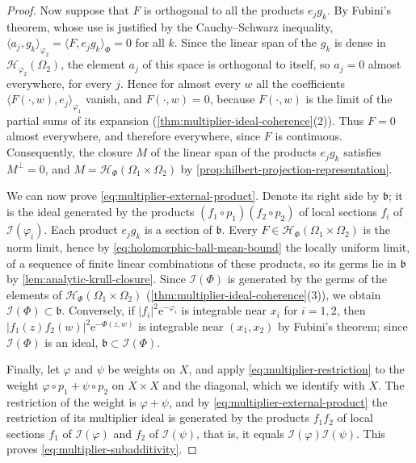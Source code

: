 \begin{proof}
Now suppose that $F$ is orthogonal to all the products $e_jg_k$. By Fubini's theorem, whose use is justified by the Cauchy--Schwarz inequality, $\langle a_j,g_k\rangle_{\varphi_2}=\langle F,e_jg_k\rangle_\Phi=0$ for all $k$. Since the linear span of the $g_k$ is dense in $\mathcal H_{\varphi_2}(\Omega_2)$, the element $a_j$ of this space is orthogonal to itself, so $a_j=0$ almost everywhere, for every $j$. Hence for almost every $w$ all the coefficients $\langle F(\cdot,w),e_j\rangle_{\varphi_1}$ vanish, and $F(\cdot,w)=0$, because $F(\cdot,w)$ is the limit of the partial sums of its expansion (\cref{thm:multiplier-ideal-coherence}(2)). Thus $F=0$ almost everywhere, and therefore everywhere, since $F$ is continuous. Consequently, the closure $M$ of the linear span of the products $e_jg_k$ satisfies $M^\perp=0$, and $M=\mathcal H_\Phi(\Omega_1\times\Omega_2)$ by \cref{prop:hilbert-projection-representation}.

We can now prove \eqref{eq:multiplier-external-product}. Denote its right side by $\mathfrak b$; it is the ideal generated by the products $(f_1\circ p_1)(f_2\circ p_2)$ of local sections $f_i$ of $\mathcal I(\varphi_i)$. Each product $e_jg_k$ is a section of $\mathfrak b$. Every $F\in\mathcal H_\Phi(\Omega_1\times\Omega_2)$ is the norm limit, hence by \eqref{eq:holomorphic-ball-mean-bound} the locally uniform limit, of a sequence of finite linear combinations of these products, so its germs lie in $\mathfrak b$ by \cref{lem:analytic-krull-closure}. Since $\mathcal I(\Phi)$ is generated by the germs of the elements of $\mathcal H_\Phi(\Omega_1\times\Omega_2)$ (\cref{thm:multiplier-ideal-coherence}(3)), we obtain $\mathcal I(\Phi)\subset\mathfrak b$. Conversely, if $|f_i|^2\mathrm e^{-\varphi_i}$ is integrable near $x_i$ for $i=1,2$, then $|f_1(z)f_2(w)|^2\mathrm e^{-\Phi(z,w)}$ is integrable near $(x_1,x_2)$ by Fubini's theorem; since $\mathcal I(\Phi)$ is an ideal, $\mathfrak b\subset\mathcal I(\Phi)$.

Finally, let $\varphi$ and $\psi$ be weights on $X$, and apply \eqref{eq:multiplier-restriction} to the weight $\varphi\circ p_1+\psi\circ p_2$ on $X\times X$ and the diagonal, which we identify with $X$. The restriction of the weight is $\varphi+\psi$, and by \eqref{eq:multiplier-external-product} the restriction of its multiplier ideal is generated by the products $f_1f_2$ of local sections $f_1$ of $\mathcal I(\varphi)$ and $f_2$ of $\mathcal I(\psi)$, that is, it equals $\mathcal I(\varphi)\mathcal I(\psi)$. This proves \eqref{eq:multiplier-subadditivity}.
\end{proof}

